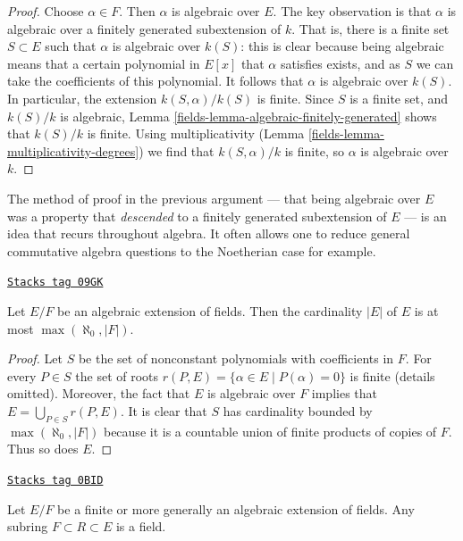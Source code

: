 \begin{proof}

Choose $\alpha \in F$. Then $\alpha$ is algebraic over $E$.
The key observation is that $\alpha$ is algebraic over a
finitely generated subextension of $k$.
That is, there is a finite set $S \subset E$ such that $\alpha $ is algebraic
over $k(S)$: this is clear because being algebraic means that a certain
polynomial in $E[x]$ that $\alpha$ satisfies exists, and as $S$ we can take the
coefficients of this polynomial. It follows that $\alpha$ is algebraic over
$k(S)$. In particular, the extension $k(S, \alpha)/ k(S)$ is finite.
Since $S$ is a finite set, and $k(S)/k$ is algebraic,
Lemma \ref{fields-lemma-algebraic-finitely-generated} shows that
$k(S)/k$ is finite. Using multiplicativity
(Lemma \ref{fields-lemma-multiplicativity-degrees})
we find that $k(S,\alpha)/k$ is finite, so $\alpha$ is algebraic over $k$.
\end{proof}

The method of proof in the previous argument --- that being algebraic
over $E$ was a property that {\it descended} to a finitely generated
subextension of $E$ --- is an idea that recurs throughout algebra.
It often allows one to reduce general commutative algebra questions
to the Noetherian case for example.

\begin{lemma}
\label{fields-lemma-size-algebraic-extension}
\href{https://stacks.math.columbia.edu/tag/09GK}{\texttt{Stacks tag 09GK}}

Let $E/F$ be an algebraic extension of fields. Then the cardinality $|E|$
of $E$ is at most $\max(\aleph_0, |F|)$.
\end{lemma}

\begin{proof}
Let $S$ be the set of nonconstant polynomials with coefficients in $F$.
For every $P \in S$ the set of roots
$r(P, E) = \{\alpha \in E \mid P(\alpha) = 0\}$
is finite (details omitted). Moreover, the fact that $E$ is algebraic
over $F$ implies that $E = \bigcup_{P \in S} r(P, E)$.
It is clear that $S$ has cardinality bounded by $\max(\aleph_0, |F|)$
because it is a countable union of finite products of copies of $F$.
Thus so does $E$.
\end{proof}

\begin{lemma}
\label{fields-lemma-subalgebra-algebraic-extension-field}
\href{https://stacks.math.columbia.edu/tag/0BID}{\texttt{Stacks tag 0BID}}

Let $E/F$ be a finite or more generally an algebraic extension of fields.
Any subring $F \subset R \subset E$ is a field.
\end{lemma}

